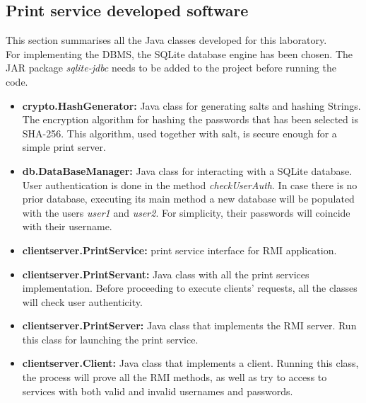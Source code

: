 \subsection{Print service developed software}
This section summarises all the Java classes developed for this laboratory.\\
For implementing the DBMS, the SQLite database engine has been chosen. The JAR package \textit{sqlite-jdbc} needs to be added to the project before running the code.
\begin{itemize}
	\item \textbf{crypto.HashGenerator:} Java class for generating salts and hashing Strings. The encryption algorithm for hashing the passwords that has been selected is SHA-256. This algorithm, used together with salt, is secure enough for a simple print server.
	\item \textbf{db.DataBaseManager:} Java class for interacting with a SQLite database. User authentication is done in the method \textit{checkUserAuth}. In case there is no prior database, executing its main method a new database will be populated with the users \textit{user1} and \textit{user2}. For simplicity, their passwords will coincide with their username.
	\item \textbf{clientserver.PrintService:} print service interface for RMI application.
	\item \textbf{clientserver.PrintServant:} Java class with all the print services implementation. Before proceeding to execute clients' requests, all the classes will check user authenticity.
	\item \textbf{clientserver.PrintServer:} Java class that implements the RMI server. Run this class for launching the print service.
	\item \textbf{clientserver.Client:} Java class that implements a client. Running this class, the process will prove all the RMI methods, as well as try to access to services with both valid and invalid usernames and passwords.
\end{itemize}